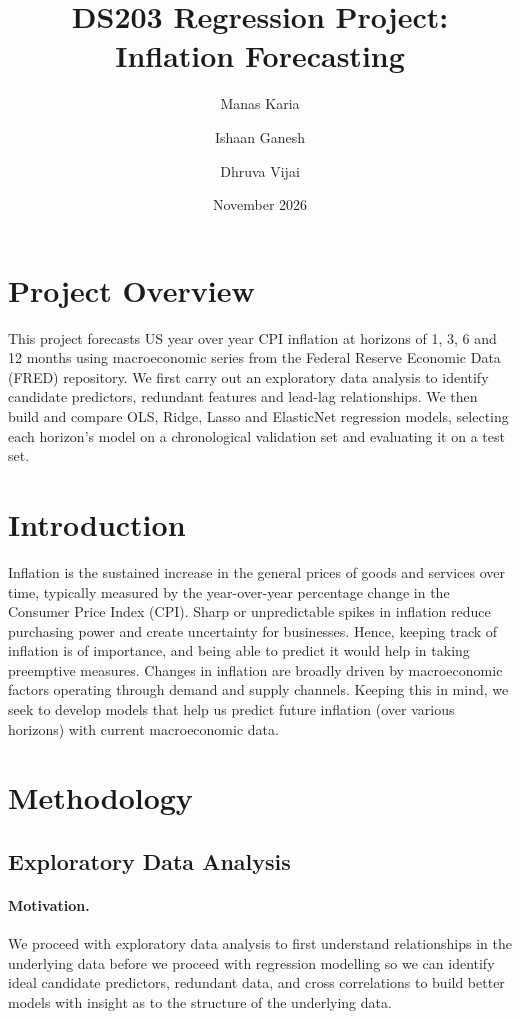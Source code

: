 \documentclass{article}
\title{DS203 Regression Project: Inflation Forecasting}
\author{Manas Karia \and Ishaan Ganesh \and Dhruva Vijai}
\date{November 2026}
\begin{document}
\maketitle

\section*{Project Overview}
This project forecasts US year over year CPI inflation at horizons of 1, 3, 6 and 12 months using macroeconomic series from the Federal Reserve Economic Data (FRED) repository. We first carry out an exploratory data analysis to identify candidate predictors, redundant features and lead-lag relationships. We then build and compare OLS, Ridge, Lasso and ElasticNet regression models, selecting each horizon's model on a chronological validation set and evaluating it on a test set.

\section{Introduction}
Inflation is the sustained increase in the general prices of goods and services over time, typically measured by the year-over-year percentage change in the Consumer Price Index (CPI). Sharp or unpredictable spikes in inflation reduce purchasing power and create uncertainty for businesses. Hence, keeping track of inflation is of importance, and being able to predict it would help in taking preemptive measures. \newline
Changes in inflation are broadly driven by macroeconomic factors operating through demand and supply channels. \newline
Keeping this in mind, we seek to develop models that help us predict future inflation (over various horizons) with current macroeconomic data.



\section{Methodology}

\subsection{Exploratory Data Analysis}

\paragraph{Motivation.}
We proceed with exploratory data analysis to first understand relationships in the underlying data before we proceed with regression modelling so we can identify ideal candidate predictors, redundant data, and cross correlations to build better models with insight as to the structure of the underlying data.
\end{document}
